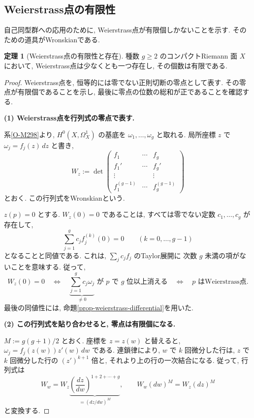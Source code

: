 \documentclass[dvipdfmx,a4paper,11pt]{article} %
\theoremstyle{definition}
\newtheorem{thm}{定理}[section]
\numberwithin{equation}{section}
\begin{document}
\subsection{Weierstrass点の有限性}

自己同型群への応用のために, 
Weierstrass点が有限個しかないことを示す.
そのための道具がWronskianである.

\begin{thm}[Weierstrass点の有限性と存在]
\label{thm-weierstrass-finite}
種数 $g\geq2$ のコンパクトRiemann 面 $X$ において,
Weierstrass点は少なくとも一つ存在し, その個数は有限である.
\end{thm}

\begin{proof}
Weierstrass点を, 恒等的には零でない正則切断の零点として表す.
その零点が有限個であることを示し,
最後に零点の位数の総和が正であることを確認する.

\medskip
\noindent
\textbf{(1) Weierstrass点を行列式の零点で表す.}

系\ref{O-M298}より,
$H^0(X,\Omega_X^1)$ の基底を
$\omega_1,\ldots,\omega_g$ と取れる.
局所座標 $z$ で $\omega_j=f_j(z)\,dz$ と書き,
\[
W_z:=
\det
\begin{pmatrix}
f_1&\cdots&f_g\\
f_1'&\cdots&f_g'\\
\vdots&&\vdots\\
f_1^{(g-1)}&\cdots&f_g^{(g-1)}
\end{pmatrix}
\]
とおく.
この行列式をWronskianという.

$z(p)=0$ とする.
$W_z(0)=0$ であることは,
すべては零でない定数 $c_1,\ldots,c_g$ が存在して,
\[
\sum_{j=1}^g c_jf_j^{(k)}(0)=0
\qquad(k=0,\ldots,g-1)
\]
となることと同値である.
これは, $\sum_jc_jf_j$ のTaylor展開に
次数 $g$ 未満の項がないことを意味する.
従って,
\[
W_z(0)=0
\quad\Longleftrightarrow\quad
\underbrace{\sum_{j=1}^g c_j\omega_j}_{\neq0}
\text{ が $p$ で $g$ 位以上消える}
\quad\Longleftrightarrow\quad
p\text{ はWeierstrass点}.
\]
最後の同値性には,
命題\ref{prop-weierstrass-differential}を用いた.

\medskip
\noindent
\textbf{(2) この行列式を貼り合わせると, 零点は有限個になる.}

$M:=g(g+1)/2$ とおく.
座標を $z=z(w)$ と替えると,
$\omega_j=f_j(z(w))z'(w)\,dw$ である.
連鎖律により, $w$ で $k$ 回微分した行は,
$z$ で $k$ 回微分した行の $(z')^{k+1}$ 倍と,
それより上の行の一次結合になる.
従って, 行列式は
\[
W_w
=W_z\underbrace{\left(\frac{dz}{dw}\right)^{1+2+\cdots+g}}
_{=(dz/dw)^M},
\qquad
W_w(dw)^M=W_z(dz)^M
\]
と変換する.


\end{proof}
\end{document}
